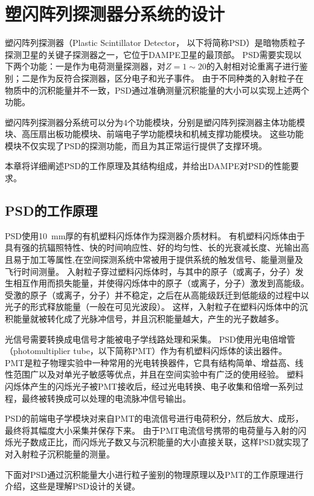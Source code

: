 \chapter{塑闪阵列探测器分系统的设计}
\label{ch:description}
塑闪阵列探测器（Plastic Scintillator Detector， 以下将简称PSD）是暗物质粒子探测卫星的关键子探测器之一，它位于DAMPE卫星的最顶部。
PSD需要实现以下两个功能：一是作为电荷测量探测器，对$Z=1\sim20$的入射相对论重离子进行鉴别；二是作为反符合探测器，区分电子和光子事件。
由于不同种类的入射粒子在物质中的沉积能量并不一致，PSD通过准确测量沉积能量的大小可以实现上述两个功能。

塑闪阵列探测器分系统可以分为4个功能模块，分别是塑闪阵列探测器主体功能模块、高压扇出板功能模块、前端电子学功能模块和机械支撑功能模块。
这些功能模块不仅实现了PSD的探测功能，而且为其正常运行提供了支撑环境。

本章将详细阐述PSD的工作原理及其结构组成，并给出DAMPE对PSD的性能要求。

\section{PSD的工作原理}
\label{sec:description:psd_principle}
PSD使用\SI{10}{\milli\meter}厚的有机塑料闪烁体作为探测器介质材料。
有机塑料闪烁体由于具有强的抗辐照特性、快的时间响应性、好的均匀性、长的光衰减长度、光输出高且易于加工等属性,在空间探测系统中常被用于提供系统的触发信号、能量测量及飞行时间测量。
入射粒子穿过塑料闪烁体时，与其中的原子（或离子，分子）发生相互作用而损失能量，并使得闪烁体中的原子（或离子，分子）激发到高能级。
受激的原子（或离子，分子）并不稳定，之后在从高能级跃迁到低能级的过程中以光子的形式释放能量（一般在可见光波段）。
这样，入射粒子在塑料闪烁体中的沉积能量就被转化成了光脉冲信号，并且沉积能量越大，产生的光子数越多。

光信号需要转换成电信号才能被电子学线路处理和采集。
PSD使用光电倍增管（photomultiplier tube，以下简称PMT）作为有机塑料闪烁体的读出器件。
PMT是粒子物理实验中一种常用的光电转换器件，它具有结构简单、增益高、线性范围广以及对单光子敏感等优点，并且在空间实验中有广泛的使用经验。
塑料闪烁体产生的闪烁光子被PMT接收后，经过光电转换、电子收集和倍增一系列过程，最终被转换成可以处理的电流脉冲信号输出。

PSD的前端电子学模块对来自PMT的电流信号进行电荷积分，然后放大、成形，最终将其幅度大小采集并保存下来。
由于PMT电流信号携带的电荷量与入射的闪烁光子数成正比，而闪烁光子数又与沉积能量的大小直接关联，这样PSD就实现了对入射粒子沉积能量的测量。

下面对PSD通过沉积能量大小进行粒子鉴别的物理原理以及PMT的工作原理进行介绍，这些是理解PSD设计的关键。

